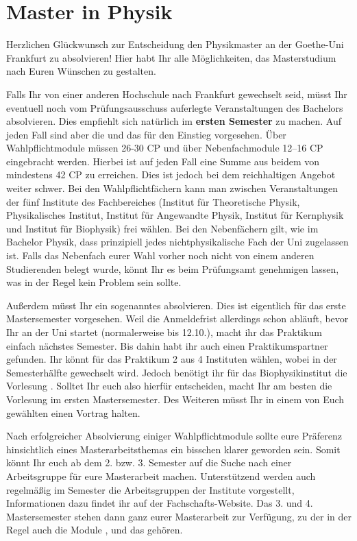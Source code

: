 \section{Master in Physik}
Herzlichen Glückwunsch zur Entscheidung den Physikmaster an der Goethe-Uni Frankfurt zu absolvieren! Hier habt Ihr alle Möglichkeiten, das Masterstudium nach Euren Wünschen zu gestalten.

Falls Ihr von einer anderen Hochschule nach Frankfurt gewechselt seid, müsst Ihr eventuell noch vom Prüfungsausschuss auferlegte Veranstaltungen des Bachelors absolvieren. Dies empfiehlt sich natürlich im \textbf{ersten Semester} zu machen. Auf jeden Fall sind aber die   und das  für den Einstieg vorgesehen. Über Wahlpflichtmodule müssen 26-30 CP und über Nebenfachmodule 12–16 CP eingebracht werden. Hierbei ist auf jeden Fall eine Summe aus beidem von mindestens 42 CP zu erreichen. Dies ist jedoch bei dem reichhaltigen Angebot weiter schwer. Bei den Wahlpflichtfächern kann man zwischen Veranstaltungen der fünf Institute des Fachbereiches (Institut für Theoretische Physik, Physikalisches Institut, Institut
für Angewandte Physik, Institut für Kernphysik und Institut für Biophysik) frei wählen. Bei den Nebenfächern gilt, wie im Bachelor Physik, dass prinzipiell jedes nichtphysikalische Fach der Uni zugelassen ist. Falls das Nebenfach eurer Wahl vorher noch nicht von einem anderen Studierenden belegt wurde, könnt Ihr es beim Prüfungsamt genehmigen lassen, was in der Regel kein Problem sein sollte.

Außerdem müsst Ihr ein sogenanntes  absolvieren. Dies ist eigentlich für das erste Mastersemester vorgesehen. Weil die Anmeldefrist allerdings schon abläuft, bevor Ihr an der Uni startet (normalerweise bis 12.10.), macht ihr das Praktikum einfach
nächstes Semester. Bis dahin habt ihr auch einen Praktikumspartner gefunden. Ihr könnt für das Praktikum 2 aus 4 Instituten wählen, wobei in der Semesterhälfte gewechselt wird. Jedoch benötigt ihr für das Biophysikinstitut die Vorlesung . Solltet Ihr
euch also hierfür entscheiden, macht Ihr am besten die Vorlesung im ersten Mastersemester. Des Weiteren müsst Ihr in einem von Euch gewählten  einen Vortrag halten.

Nach erfolgreicher Absolvierung einiger Wahlpflichtmodule sollte eure Präferenz hinsichtlich eines Masterarbeitsthemas ein bisschen klarer geworden sein. Somit könnt Ihr euch ab dem
2. bzw. 3. Semester auf die Suche nach einer Arbeitsgruppe für eure Masterarbeit machen. Unterstützend werden auch regelmäßig im Semester die Arbeitsgruppen der Institute vorgestellt,
Informationen dazu findet ihr auf der Fachschafts-Website.
Das 3. und 4. Mastersemester stehen dann ganz eurer Masterarbeit zur Verfügung, zu der in der Regel auch die Module ,  und das  gehören.